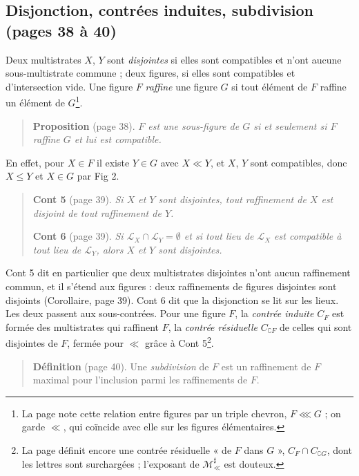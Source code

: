 \documentclass[11pt,a4paper]{article}
\begin{document}
\subsection*{Disjonction, contrées induites, subdivision (pages 38 à 40)}

Deux multistrates $X$, $Y$ sont \emph{disjointes} si elles sont compatibles
et n'ont aucune sous-multistrate commune ; deux figures, si elles sont
compatibles et d'intersection vide. Une figure $F$ \emph{raffine} une figure
$G$ si tout élément de $F$ raffine un élément de $G$\footnote{La page note
cette relation entre figures par un triple chevron, $F \lll G$ ; on garde $\ll$,
qui coïncide avec elle sur les figures élémentaires.}.

\begin{quote}
\textbf{Proposition} (page 38). \emph{$F$ est une sous-figure de $G$ si et
seulement si $F$ raffine $G$ et lui est compatible.}
\end{quote}

En effet, pour $X \in F$ il existe $Y \in G$ avec $X \ll Y$, et $X$, $Y$ sont
compatibles, donc $X \leq Y$ et $X \in G$ par Fig 2.

\begin{quote}
\textbf{Cont 5} (page 39). \emph{Si $X$ et $Y$ sont disjointes, tout
raffinement de $X$ est disjoint de tout raffinement de $Y$.}

\textbf{Cont 6} (page 39). \emph{Si $\mathcal{L}_{X} \cap \mathcal{L}_{Y} =
\emptyset$ et si tout lieu de $\mathcal{L}_{X}$ est compatible à tout lieu de
$\mathcal{L}_{Y}$, alors $X$ et $Y$ sont disjointes.}
\end{quote}

Cont 5 dit en particulier que deux multistrates disjointes n'ont aucun
raffinement commun, et il s'étend aux figures : deux raffinements de figures
disjointes sont disjoints (Corollaire, page 39). Cont 6 dit que la disjonction
se lit sur les lieux. Les deux
passent aux sous-contrées. Pour une figure $F$, la \emph{contrée induite}
$C_{F}$ est formée des multistrates qui raffinent $F$, la \emph{contrée
résiduelle} $C_{\complement F}$ de celles qui sont disjointes de $F$, fermée
pour $\ll$ grâce à Cont 5\footnote{La page définit encore une contrée
résiduelle « de $F$ dans $G$ », $C_{F} \cap C_{\complement G}$, dont les lettres
sont surchargées ; l'exposant de $\mathcal{M}^{\sharp}_{\ll}$ est douteux.}.

\begin{quote}
\textbf{Définition} (page 40). Une \emph{subdivision} de $F$ est un raffinement
de $F$ maximal pour l'inclusion parmi les raffinements de $F$.
\end{quote}
\end{document}
